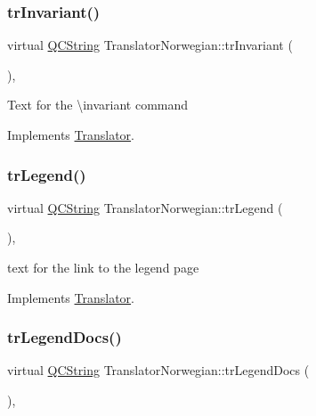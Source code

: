\subsubsection{\texorpdfstring{trInvariant()}{trInvariant()}}
{\footnotesize\ttfamily virtual \mbox{\hyperlink{class_q_c_string}{Q\+C\+String}} Translator\+Norwegian\+::tr\+Invariant (\begin{DoxyParamCaption}{ }\end{DoxyParamCaption})\hspace{0.3cm}{\ttfamily [inline]}, {\ttfamily [virtual]}}

Text for the \textbackslash{}invariant command 

Implements \mbox{\hyperlink{class_translator}{Translator}}.

\mbox{\label{class_translator_norwegian_ad360060e3c275b75a2bec2f3be9fcc51}} 
\subsubsection{\texorpdfstring{trLegend()}{trLegend()}}
{\footnotesize\ttfamily virtual \mbox{\hyperlink{class_q_c_string}{Q\+C\+String}} Translator\+Norwegian\+::tr\+Legend (\begin{DoxyParamCaption}{ }\end{DoxyParamCaption})\hspace{0.3cm}{\ttfamily [inline]}, {\ttfamily [virtual]}}

text for the link to the legend page 

Implements \mbox{\hyperlink{class_translator}{Translator}}.

\mbox{\label{class_translator_norwegian_aa9efd8f4b10cd329e4958461ac7d833a}} 
\subsubsection{\texorpdfstring{trLegendDocs()}{trLegendDocs()}}
{\footnotesize\ttfamily virtual \mbox{\hyperlink{class_q_c_string}{Q\+C\+String}} Translator\+Norwegian\+::tr\+Legend\+Docs (\begin{DoxyParamCaption}{ }\end{DoxyParamCaption})\hspace{0.3cm}{\ttfamily [inline]}, {\ttfamily [virtual]}}

